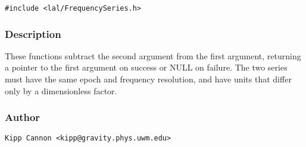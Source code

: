 \begin{verbatim}
#include <lal/FrequencySeries.h>
\end{verbatim}


\subsubsection{Description}

These functions subtract the second argument from the first argument,
returning a pointer to the first argument on success or NULL on failure.
The two series must have the same epoch and frequency resolution, and have
units that differ only by a dimensionless factor.

\subsubsection{Author}

\verb|Kipp Cannon <kipp@gravity.phys.uwm.edu>|

